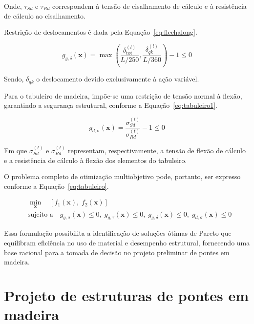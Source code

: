 Onde, $\tau_{Sd}$ e $\tau_{Rd}$ correspondem à tensão de cisalhamento de cálculo e à resistência de cálculo ao cisalhamento.

Restrição de deslocamentos é dada pela Equação~\eqref{eq:flechalong}.

\begin{equation}
g_{g,\delta}(\mathbf{x}) =
\max \left(
\frac{\delta_{\mathrm{tot}}^{(l)}}{L/250},
\frac{\delta_{qk}^{(l)}}{L/360}
\right) - 1 \leq 0
\label{eq:flechalong}
\end{equation}
    
Sendo, $\delta_{qk}$ o deslocamento devido exclusivamente à ação variável.

Para o tabuleiro de madeira, impõe-se uma restrição de tensão normal à flexão, garantindo a segurança estrutural, conforme a Equação~\eqref{eq:tabuleiro1}.

\begin{equation}
g_{d,\sigma}(\mathbf{x}) =
\frac{\sigma_{Sd}^{(t)}}{\sigma_{Rd}^{(t)}} - 1 \leq 0
\label{eq:tabuleiro1}
\end{equation}

Em que $\sigma_{Sd}^{(t)}$ e $\sigma_{Rd}^{(t)}$ representam, respectivamente, a tensão de flexão de cálculo e a resistência de cálculo à flexão dos elementos do tabuleiro.

O problema completo de otimização multiobjetivo pode, portanto, ser expresso conforme a Equação~\eqref{eq:tabuleiro}.

\begin{equation}
\begin{aligned}
& \min_{\mathbf{x}} \quad \left[ f_1(\mathbf{x}),\; f_2(\mathbf{x}) \right] \\
& \text{sujeito a} \quad
g_{g,\sigma}(\mathbf{x}) \leq 0,\;
g_{g,\tau}(\mathbf{x}) \leq 0,\;
g_{g,\delta}(\mathbf{x}) \leq 0,\;
g_{d,\sigma}(\mathbf{x}) \leq 0
\label{eq:tabuleiro}
\end{aligned}
\end{equation}

Essa formulação possibilita a identificação de soluções ótimas de Pareto que equilibram eficiência no uso de material e desempenho estrutural, fornecendo uma base racional para a tomada de decisão no projeto preliminar de pontes em madeira.

\section{Projeto de estruturas de pontes em madeira}\label{sec:proj_estrutras}

